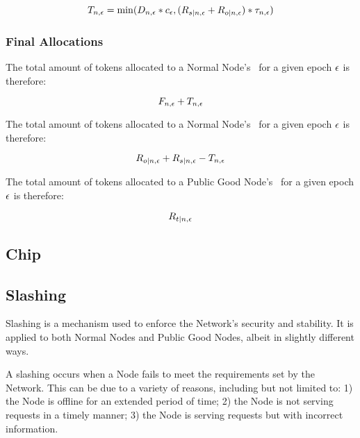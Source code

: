 \begin{equation}
    T_{n, \epsilon} =
    \min(D_{n, \epsilon}
    * c_{\epsilon} , (R_{s|n, \epsilon}
    + R_{o|n, \epsilon} ) 
    * \tau_{n, \epsilon})
\end{equation}

\subsubsection{Final Allocations}
\label{subsubsec:allocation}

The total amount of tokens allocated to a Normal Node's \operationPool\ for a given epoch $\epsilon$ is therefore:

\begin{equation}
    F_{n, \epsilon}
    + T_{n, \epsilon}
\end{equation}

The total amount of tokens allocated to a Normal Node's \stakingPool\ for a given epoch $\epsilon$ is therefore:

\begin{equation}
    R_{o|n, \epsilon}
    + R_{s|n, \epsilon}
    - T_{n, \epsilon}
\end{equation}

The total amount of tokens allocated to a Public Good Node's \publicGoodPool\ for a given epoch $\epsilon$ is therefore:

\begin{equation}
    R_{t|n, \epsilon}
\end{equation}

\subsection{Chip}

\subsection{Slashing}

Slashing is a mechanism used to enforce the Network's security and stability. It is applied to both Normal Nodes and Public Good Nodes, albeit in slightly different ways.

A slashing occurs when a Node fails to meet the requirements set by the Network. This can be due to a variety of reasons, including but not limited to: 1) the Node is offline for an extended period of time; 2) the Node is not serving requests in a timely manner; 3) the Node is serving requests but with incorrect information.

